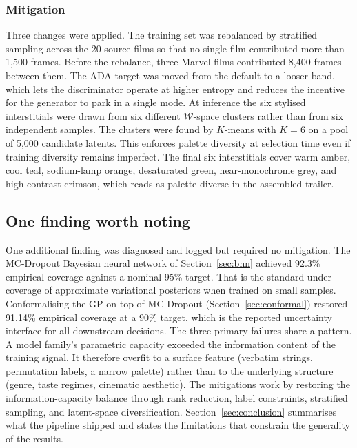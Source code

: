 \documentclass{article}
\begin{document}
\subsubsection*{Mitigation}

Three changes were applied. The training set was rebalanced by stratified sampling across the 20 source films so that no single film contributed more than 1{,}500 frames. Before the rebalance, three Marvel films contributed 8{,}400 frames between them. The ADA target was moved from the default to a looser band, which lets the discriminator operate at higher entropy and reduces the incentive for the generator to park in a single mode. At inference the six stylised interstitials were drawn from six different $\mathcal{W}$-space clusters rather than from six independent samples. The clusters were found by $K$-means with $K = 6$ on a pool of 5{,}000 candidate latents. This enforces palette diversity at selection time even if training diversity remains imperfect. The final six interstitials cover warm amber, cool teal, sodium-lamp orange, desaturated green, near-monochrome grey, and high-contrast crimson, which reads as palette-diverse in the assembled trailer.

\subsection{One finding worth noting}

One additional finding was diagnosed and logged but required no mitigation. The MC-Dropout Bayesian neural network of Section~\ref{sec:bnn} achieved 92.3\% empirical coverage against a nominal 95\% target. That is the standard under-coverage of approximate variational posteriors when trained on small samples. Conformalising the GP on top of MC-Dropout (Section~\ref{sec:conformal}) restored 91.14\% empirical coverage at a 90\% target, which is the reported uncertainty interface for all downstream decisions. The three primary failures share a pattern. A model family's parametric capacity exceeded the information content of the training signal. It therefore overfit to a surface feature (verbatim strings, permutation labels, a narrow palette) rather than to the underlying structure (genre, taste regimes, cinematic aesthetic). The mitigations work by restoring the information-capacity balance through rank reduction, label constraints, stratified sampling, and latent-space diversification. Section~\ref{sec:conclusion} summarises what the pipeline shipped and states the limitations that constrain the generality of the results.
\end{document}
